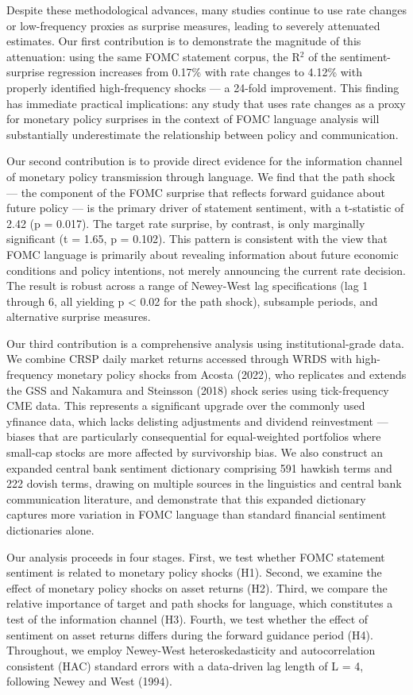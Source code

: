 Despite these methodological advances, many studies continue to use rate changes or low-frequency proxies as surprise measures, leading to severely attenuated estimates. Our first contribution is to demonstrate the magnitude of this attenuation: using the same FOMC statement corpus, the R$^2$ of the sentiment-surprise regression increases from 0.17\% with rate changes to 4.12\% with properly identified high-frequency shocks --- a 24-fold improvement. This finding has immediate practical implications: any study that uses rate changes as a proxy for monetary policy surprises in the context of FOMC language analysis will substantially underestimate the relationship between policy and communication.

Our second contribution is to provide direct evidence for the information channel of monetary policy transmission through language. We find that the path shock --- the component of the FOMC surprise that reflects forward guidance about future policy --- is the primary driver of statement sentiment, with a t-statistic of 2.42 (p = 0.017). The target rate surprise, by contrast, is only marginally significant (t = 1.65, p = 0.102). This pattern is consistent with the view that FOMC language is primarily about revealing information about future economic conditions and policy intentions, not merely announcing the current rate decision. The result is robust across a range of Newey-West lag specifications (lag 1 through 6, all yielding p < 0.02 for the path shock), subsample periods, and alternative surprise measures.

Our third contribution is a comprehensive analysis using institutional-grade data. We combine CRSP daily market returns accessed through WRDS with high-frequency monetary policy shocks from Acosta (2022), who replicates and extends the GSS and Nakamura and Steinsson (2018) shock series using tick-frequency CME data. This represents a significant upgrade over the commonly used yfinance data, which lacks delisting adjustments and dividend reinvestment --- biases that are particularly consequential for equal-weighted portfolios where small-cap stocks are more affected by survivorship bias. We also construct an expanded central bank sentiment dictionary comprising 591 hawkish terms and 222 dovish terms, drawing on multiple sources in the linguistics and central bank communication literature, and demonstrate that this expanded dictionary captures more variation in FOMC language than standard financial sentiment dictionaries alone.

Our analysis proceeds in four stages. First, we test whether FOMC statement sentiment is related to monetary policy shocks (H1). Second, we examine the effect of monetary policy shocks on asset returns (H2). Third, we compare the relative importance of target and path shocks for language, which constitutes a test of the information channel (H3). Fourth, we test whether the effect of sentiment on asset returns differs during the forward guidance period (H4). Throughout, we employ Newey-West heteroskedasticity and autocorrelation consistent (HAC) standard errors with a data-driven lag length of L = 4, following Newey and West (1994).


